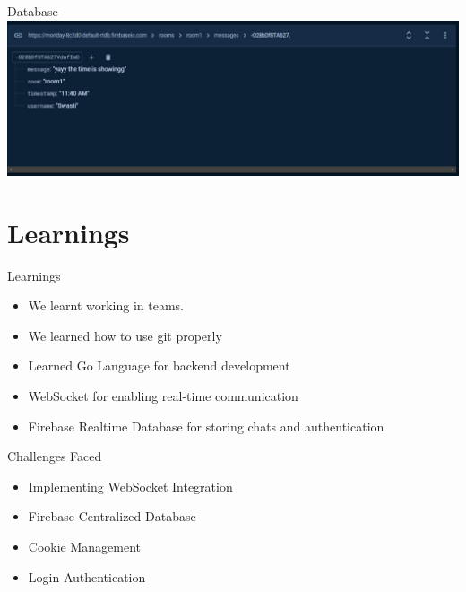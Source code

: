 \documentclass{beamer}
\begin{document}
\begin{frame}{Database}
    \centering
    \includegraphics[width=\textwidth]{4.jpg}
\end{frame}

\section{Learnings}
\begin{frame}{Learnings}
    \begin{itemize}
        \item{We learnt working in teams.}
    \end{itemize}
    \begin{itemize}
        \item{We learned how to use git properly}
    \end{itemize}
    \begin{itemize}
        \item {Learned Go Language for backend development}
    \end{itemize}
    \begin{itemize}
        \item{WebSocket for enabling real-time communication}
    \end{itemize}
    \begin{itemize}
        \item{Firebase Realtime Database for storing chats and authentication}
    \end{itemize}
\end{frame}



\begin{frame}{Challenges Faced}
    \begin{itemize}
        \item{Implementing WebSocket Integration}
    \end{itemize}
    \begin{itemize}
        \item{Firebase Centralized Database}
    \end{itemize}
    \begin{itemize}
        \item{Cookie Management}
    \end{itemize}
    \begin{itemize}
        \item{Login Authentication}
    \end{itemize}
    
\end{frame}
\end{document}
